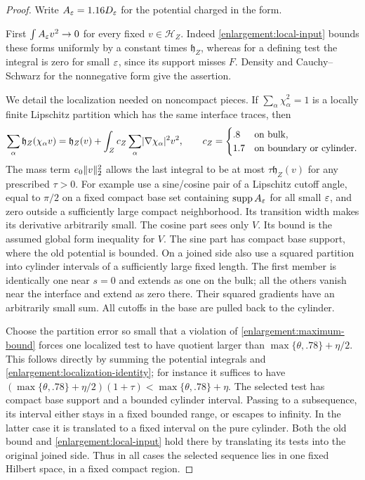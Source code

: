 \begin{proof}
Write $A_\varepsilon=1.16D_\varepsilon$ for the potential charged in the form.

First $\int A_\varepsilon v^2\to0$ for every fixed $v\in\mathcal H_Z$.
Indeed \cref{enlargement:local-input} bounds these forms uniformly by a
constant times $\mathfrak h_Z$, whereas for a defining test the integral
is zero for small $\varepsilon$, since its support misses $F$.  Density and
Cauchy--Schwarz for the nonnegative form give the assertion.

We detail the localization needed on noncompact pieces.  If
$\sum_\alpha\chi_\alpha^2=1$ is a locally finite Lipschitz partition
which has the same interface traces, then
\begin{equation}\label{enlargement:localization-identity}
 \sum_\alpha\mathfrak h_Z(\chi_\alpha v)
 =\mathfrak h_Z(v)+
   \int_Z c_Z\sum_\alpha\lvert\nabla\chi_\alpha\rvert^2v^2,
 \qquad
 c_Z=\begin{cases}.8&\text{on bulk},\\1.7&\text{on boundary or cylinder}.
 \end{cases}
\end{equation}
The mass term $e_0\lVert v\rVert_2^2$ allows the last integral to be at most
$\tau\mathfrak h_Z(v)$ for any prescribed $\tau>0$.  For example use a
sine/cosine pair of a Lipschitz cutoff angle, equal to $\pi/2$ on a
fixed compact base set containing $\operatorname{supp} A_\varepsilon$ for all small $\varepsilon$,
and zero outside a sufficiently large compact neighborhood.  Its transition width makes its derivative
arbitrarily small.  The cosine part sees only $V$. Its bound is the assumed global
form inequality for $V$.
The sine part has compact base support, where the old potential is bounded.
On a joined side
also use a squared partition into cylinder intervals of a sufficiently
large fixed length.  The first member is identically one near $s=0$
and extends as one on the bulk; all the others vanish near the interface
and extend as zero there.  Their squared gradients have an arbitrarily
small sum.  All cutoffs in the base are pulled back to the cylinder.

Choose the partition error so small that a violation of
\cref{enlargement:maximum-bound} forces one localized test to have quotient
larger than $\max\{\theta,.78\}+\eta/2$.  This follows directly by
summing the potential integrals and \cref{enlargement:localization-identity}; for instance it
suffices to have
$(\max\{\theta,.78\}+\eta/2)(1+\tau)
 <\max\{\theta,.78\}+\eta$.
The selected test has compact base support and a bounded cylinder
interval.  Passing to a subsequence, its interval either stays in a
fixed bounded range, or escapes to infinity.  In the latter case it is
translated to a fixed interval on the pure cylinder.  Both the old
bound and \cref{enlargement:local-input} hold there by translating its tests
into the original joined side.  Thus in all cases the selected sequence
lies in one fixed Hilbert space, in a fixed compact region.


\end{proof}
